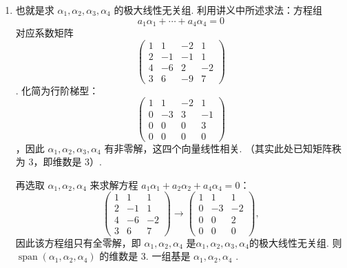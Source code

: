 \documentclass[UTF8,12pt,a4paper,fontset=fandol]{ctexart}
\begin{document}
\begin{solve}
\begin{enumerate}
                \item 也就是求 $\alpha_1,\alpha_2,\alpha_3,\alpha_4$ 的极大线性无关组. 利用讲义中所述求法：方程组
                      \[ a_1\alpha_1+\cdots+a_4\alpha_4=0 \]
                      对应系数矩阵 
\[\begin{pmatrix}
                              1 & 1  & -2 & 1  \\
                              2 & -1 & -1 & 1  \\
                              4 & -6 & 2  & -2 \\
                              3 & 6  & -9 & 7\end{pmatrix}\]
. 化简为行阶梯型：
\[\begin{pmatrix}
                              1 & 1  & -2 & 1  \\
                              0 & -3 & 3  & -1 \\
                              0 & 0  & 0  & 3  \\
                              0 & 0  & 0  & 0\end{pmatrix}\]
，因此 $\alpha_1,\alpha_2,\alpha_3,\alpha_4$ 有非零解，这四个向量线性相关. （其实此处已知矩阵秩为 3，即维数是 3）.

                      再选取 $\alpha_1,\alpha_2,\alpha_4$ 来求解方程 $a_1\alpha_1+a_2\alpha_2+a_4\alpha_4=0$：
                      \[\begin{pmatrix}
                              1 & 1  & 1  \\
                              2 & -1 & 1  \\
                              4 & -6 & -2 \\
                              3 & 6  & 7\end{pmatrix}\rightarrow\begin{pmatrix}
                              1 & 1  & 1  \\
                              0 & -3 & -2 \\
                              0 & 0  & 2  \\
                              0 & 0  & 0\end{pmatrix},\]
                      因此该方程组只有全零解，即 $\alpha_1,\alpha_2,\alpha_4$ 是$\alpha_1,\alpha_2,\alpha_3,\alpha_4$的极大线性无关组. 则 $\operatorname{span}(\alpha_1,\alpha_2,\alpha_4)$ 的维数是 3. 一组基是 $\alpha_1,\alpha_2,\alpha_4$ .


\end{enumerate}
\end{solve}
\end{document}
